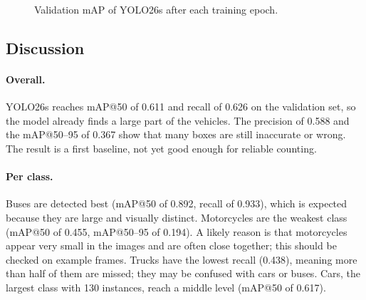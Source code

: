 \documentclass[12pt,a4paper]{article}
\begin{document}
\begin{figure}[H]
\centering
{}
\caption{Validation mAP of YOLO26s after each training epoch.}
\label{fig:ml-curve}
\end{figure}

\subsection{Discussion}
\label{subsec:ml-discussion}
\paragraph{Overall.}
YOLO26s reaches mAP@50 of 0.611 and recall of 0.626 on the validation set, so
the model already finds a large part of the vehicles. The precision of 0.588 and
the mAP@50--95 of 0.367 show that many boxes are still inaccurate or wrong.
The result is a first baseline, not yet good enough for reliable counting.

\paragraph{Per class.}
Buses are detected best (mAP@50 of 0.892, recall of 0.933), which is expected
because they are large and visually distinct. Motorcycles are the weakest class
(mAP@50 of 0.455, mAP@50--95 of 0.194). A likely reason is that motorcycles appear
very small in the images and are often close together; this should be checked
on example frames. Trucks have the lowest recall (0.438), meaning more than half of
them are missed; they may be confused with cars or buses. Cars, the largest
class with 130 instances, reach a middle level (mAP@50 of 0.617).
\end{document}

